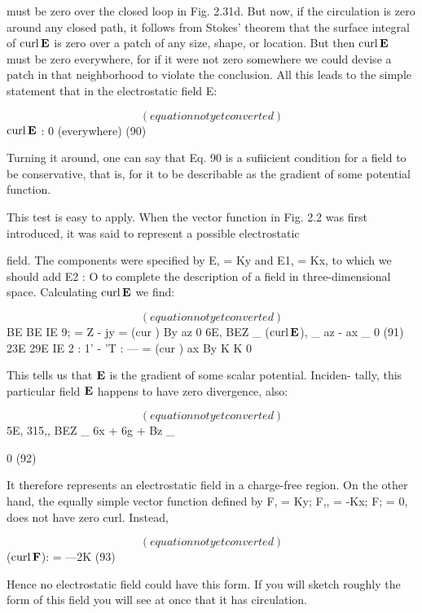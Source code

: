 {must be zero over the closed loop in Fig. 2.31d. But now, if the circulation
is zero around any closed path, it follows from Stokes'
theorem that the surface integral of $\operatorname{curl}\mathbf{E}$ is zero over a patch of any
size, shape, or location. But then $\operatorname{curl}\mathbf{E}$ must be zero everywhere,
for if it were not zero somewhere we could devise a patch in that
neighborhood to violate the conclusion. All this leads to the simple
statement that in the electrostatic field E:

\begin{equation}
(equation not yet converted)
\end{equation}
$\operatorname{curl}\mathbf{E}$ : 0 (everywhere) (90)

Turning it around, one can say that Eq. 90 is a sufiicient condition for
a field to be conservative, that is, for it to be describable as the gradient
of some potential function.

This test is easy to apply. When the vector function in Fig. 2.2
was first introduced, it was said to represent a possible electrostatic

field. The components were specified by E, = Ky and E1, = Kx, to
which we should add E2 : O to complete the description of a field
in three-dimensional space. Calculating $\operatorname{curl}\mathbf{E}$ we find:

\begin{equation}
(equation not yet converted)
\end{equation}
BE BE
IE 9; = Z - jy =
(cur ) By az 0
6E, BEZ _
($\operatorname{curl}\mathbf{E}$), _ az - ax _ 0 (91)
23E 29E
IE 2 : 1' - 'T : --- =
(cur ) ax By K K 0

This tells us that $\mathbf{E}$ is the gradient of some scalar potential. Inciden-
tally, this particular field $\mathbf{E}$ happens to have zero divergence, also:

\begin{equation}
(equation not yet converted)
\end{equation}
5E, 315,, BEZ _
6x + 6g + Bz _

0 (92)

It therefore represents an electrostatic field in a charge-free region.
On the other hand, the equally simple vector function defined by
F, = Ky; F,, = -Kx; F; = 0, does not have zero curl. Instead,

\begin{equation}
(equation not yet converted)
\end{equation}
($\operatorname{curl}\mathbf{F}$): = ---2K (93)

Hence no electrostatic field could have this form. If you will sketch
roughly the form of this field you will see at once that it has
circulation.

}
